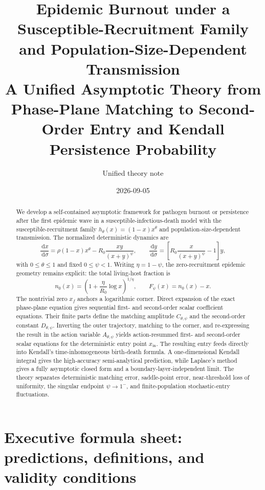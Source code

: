\documentclass[11pt]{article}
\title{Epidemic Burnout under a Susceptible-Recruitment Family and Population-Size-Dependent Transmission\\[0.4em]\large A Unified Asymptotic Theory from Phase-Plane Matching to Second-Order Entry and Kendall Persistence Probability}
\author{Unified theory note}
\date{2026-09-05}
\newcommand{\Rzero}{R_0}
\newcommand{\Fpsi}{F_\psi}
\newcommand{\Apsi}{A_{\theta,\psi}}
\newcommand{\Cpsi}{C_{\theta,\psi}}
\newcommand{\Dpsi}{D_{\theta,\psi}}
\newcommand{\xf}{x_f}
\newcommand{\xin}{x_{\mathrm{in}}}
\newcommand{\dd}{\,\mathrm{d}}
\begin{document}
\maketitle

\begin{abstract}
We develop a self-contained asymptotic framework for pathogen burnout or persistence after the first epidemic wave in a susceptible-infectious-death model with the susceptible-recruitment family $h_\theta(x)=(1-x)x^\theta$ and population-size-dependent transmission. The normalized deterministic dynamics are
\[
\frac{\dd x}{\dd \sigma}=\rho(1-x)x^\theta-\Rzero\frac{xy}{(x+y)^\psi},
\qquad
\frac{\dd y}{\dd \sigma}=\left[\Rzero\frac{x}{(x+y)^\psi}-1\right]y,
\]
with \(0\leq\theta\leq1\) and fixed \(0\leq\psi<1\). Writing \(\eta=1-\psi\), the zero-recruitment epidemic geometry remains explicit: the total living-host fraction is
\[
n_0(x)=\left(1+\frac{\eta}{\Rzero}\log x\right)^{1/\eta},
\qquad
\Fpsi(x)=n_0(x)-x.
\]
The nontrivial zero \(\xf\) anchors a logarithmic corner. Direct expansion of the exact phase-plane equation gives sequential first- and second-order scalar coefficient equations. Their finite parts define the matching amplitude \(\Cpsi\) and the second-order constant \(\Dpsi\). Inverting the outer trajectory, matching to the corner, and re-expressing the result in the action variable \(\Apsi\) yields action-resummed first- and second-order scalar equations for the deterministic entry point \(\xin\). The resulting entry feeds directly into Kendall's time-inhomogeneous birth-death formula. A one-dimensional Kendall integral gives the high-accuracy semi-analytical prediction, while Laplace's method gives a fully asymptotic closed form and a boundary-layer-independent limit. The theory separates deterministic matching error, saddle-point error, near-threshold loss of uniformity, the singular endpoint \(\psi\to1^-\), and finite-population stochastic-entry fluctuations.
\end{abstract}

\tableofcontents
\clearpage

\section{Executive formula sheet: predictions, definitions, and validity conditions}
\end{document}
